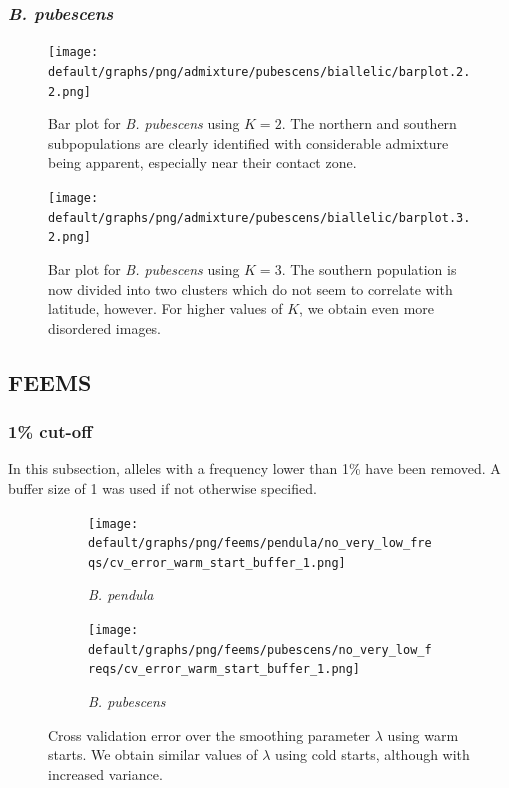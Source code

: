 \documentclass[hidelinks,11pt]{article}
\newcommand{\pendula}{\textit{B. pendula}}
\newcommand{\pubescens}{\textit{B. pubescens}}
\begin{document}
    \subsubsection{\pubescens{}}

    \begin{figure}[H]
        \centering
        \texttt{[image: default/graphs/png/admixture/pubescens/biallelic/barplot.2.2.png]}
        \caption{Bar plot for \pubescens{} using $K=2$. The northern and southern subpopulations are clearly identified with considerable admixture being apparent, especially near their contact zone.}
        \label{fig:admixture_barplot_pubescens_2}
    \end{figure}

    \begin{figure}[H]
        \centering
        \texttt{[image: default/graphs/png/admixture/pubescens/biallelic/barplot.3.2.png]}
        \caption{Bar plot for \pubescens{} using $K=3$. The southern population is now divided into two clusters which do not seem to correlate with latitude, however. For higher values of $K$, we obtain even more disordered images.}
        \label{fig:admixture_barplot_pubescens_3}
    \end{figure}

    \clearpage

    \subsection{FEEMS}
    \label{sec:appendix-feems}

    \subsubsection{1\% cut-off}

    In this subsection, alleles with a frequency lower than 1\% have been removed. A buffer size of 1 was used if not otherwise specified.

    \begin{figure}[H]
        \centering
        \begin{subfigure}[b]{0.48\textwidth}
            \centering
            \texttt{[image: default/graphs/png/feems/pendula/no\_very\_low\_freqs/cv\_error\_warm\_start\_buffer\_1.png]}
            \caption{\pendula{}}
        \end{subfigure}
        \hfill
        \begin{subfigure}[b]{0.48\textwidth}
            \centering
            \texttt{[image: default/graphs/png/feems/pubescens/no\_very\_low\_freqs/cv\_error\_warm\_start\_buffer\_1.png]}
            \caption{\pubescens{}}
        \end{subfigure}
        \caption{Cross validation error over the smoothing parameter $\lambda$ using warm starts. We obtain similar values of $\lambda$ using cold starts, although with increased variance.}
        \label{fig:feems_cv_error_no_very_low_freqs}
    \end{figure}
\end{document}
